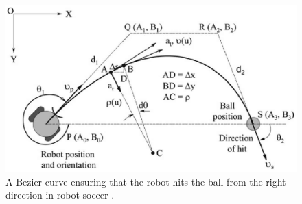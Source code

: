 \begin{figure}[h!]
	\centering
	\includegraphics[width=0.5\linewidth]{fig/lit_rev/bezier_soccer.jpg}
	\caption[A Bezier curve ensuring that the robot hits the ball from the right direction in robot soccer.]{A Bezier curve ensuring that the robot hits the ball from the right direction in robot soccer \citep{jolly2009bezier}.}
	\vspace*{5.5in}
	\label{fig:bezier_soccer}
\end{figure}


